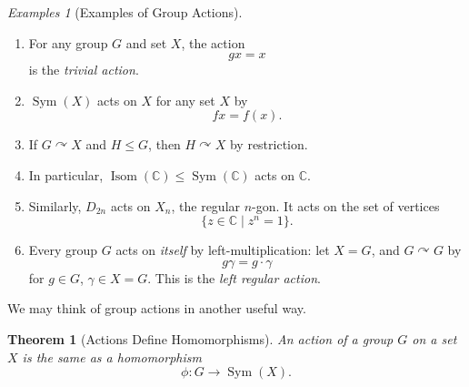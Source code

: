 \documentclass{article}
\newtheorem{theorem}{Theorem}[section]
\theoremstyle{definition}
\theoremstyle{remark}
\newcommand{\pqty}[1]{\left(#1\right)}
\newcommand{\set}[2]{\{#1\mid #2\}}
\newcommand{\functiondomain}[3]{#1:#2\to #3}
\newcommand{\subgroup}{\leq}
\newcommand{\actson}{\curvearrowright}
\newcommand{\CC}{\mathbb{C}}
\newcommand{\Sym}{\operatorname{Sym}}
\newtheorem*{examples*}{Examples}
\newcommand{\Isom}{\operatorname{Isom}}
\begin{document}
\begin{examples*}[Examples of Group Actions]
    \begin{enumerate}
        \item For any group \(G\) and set \(X\), the action
        \[
            gx = x
        \]
        is the \emph{trivial action}.
        \item \(\Sym\pqty{X}\) acts on \(X\) for any set \(X\) by
        \[
            fx = f\pqty{x}.
        \]
        \item If \(G \actson X\) and \(H \subgroup G\), then \(H \actson X\) by restriction.
        \item In particular, \(\Isom\pqty{\CC} \subgroup \Sym\pqty{\CC}\) acts on \(\CC\).
        \item Similarly, \(D_{2n}\) acts on \(X_n\), the regular \(n\)-gon. It acts on the set of vertices
        \[
            \set{z \in \CC}{z^n = 1}.
        \]
        \item Every group \(G\) acts on \emph{itself} by left-multiplication: let \(X = G\), and \(G \actson G\) by
        \[
            g\gamma = g \cdot \gamma
        \]
        for \(g \in G\), \(\gamma \in X = G\). This is the \emph{left regular action}.
    \end{enumerate}
\end{examples*}

We may think of group actions in another useful way.

\begin{theorem}[Actions Define Homomorphisms]
    \label{thm:action-homomorphism}%
    An action of a group \(G\) on a set \(X\) is the same as a homomorphism
    \[
        \functiondomain{\phi}{G}{\Sym\pqty{X}}.
    \]
\end{theorem}
\end{document}
